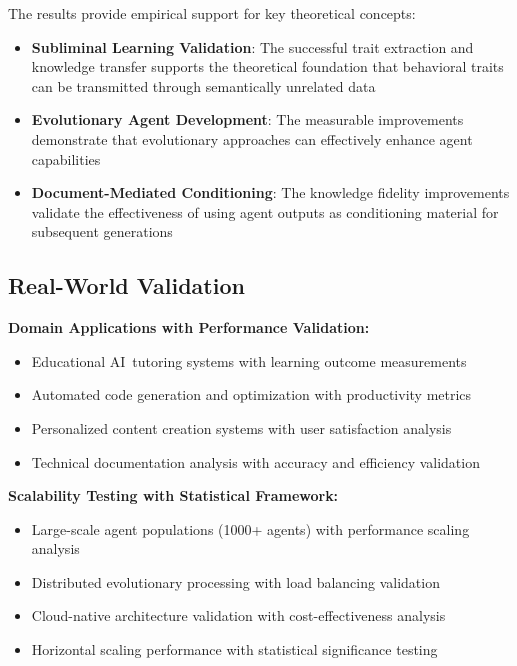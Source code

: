 \documentclass[10pt]{article}
\theoremstyle{definition}
\newcommand{\ai}{\textsc{AI}}
\begin{document}
The results provide empirical support for key theoretical concepts:

\begin{itemize}
    \item \textbf{Subliminal Learning Validation}: The successful trait extraction and knowledge transfer supports the theoretical foundation that behavioral traits can be transmitted through semantically unrelated data
    \item \textbf{Evolutionary Agent Development}: The measurable improvements demonstrate that evolutionary approaches can effectively enhance agent capabilities
    \item \textbf{Document-Mediated Conditioning}: The knowledge fidelity improvements validate the effectiveness of using agent outputs as conditioning material for subsequent generations
\end{itemize}

\subsection{Real-World Validation}

\textbf{Domain Applications with Performance Validation:}

\begin{itemize}
    \item Educational \ai\ tutoring systems with learning outcome measurements
    \item Automated code generation and optimization with productivity metrics
    \item Personalized content creation systems with user satisfaction analysis
    \item Technical documentation analysis with accuracy and efficiency validation
\end{itemize}

\textbf{Scalability Testing with Statistical Framework:}

\begin{itemize}
    \item Large-scale agent populations (1000+ agents) with performance scaling analysis
    \item Distributed evolutionary processing with load balancing validation
    \item Cloud-native architecture validation with cost-effectiveness analysis
    \item Horizontal scaling performance with statistical significance testing
\end{itemize}
\end{document}
